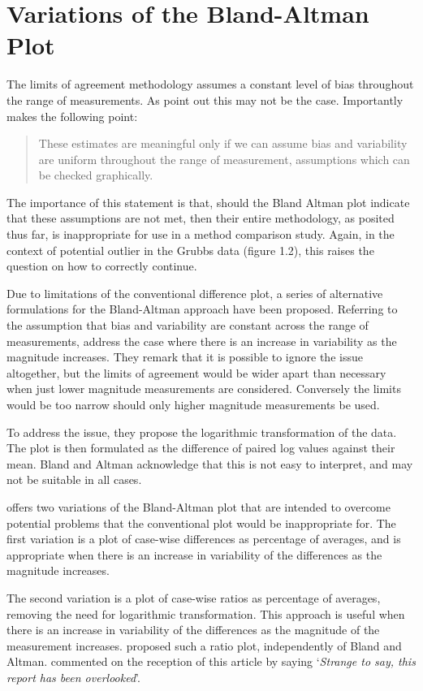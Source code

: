 \documentclass[12pt, a4paper]{report}
\theoremstyle{plain}
\theoremstyle{definition}
\theoremstyle{remark}
\begin{document}
\section{Variations of the Bland-Altman Plot} 
The limits of agreement methodology assumes a constant level of bias throughout the range of measurements. As \citet*{BA86} point out this may not be the case. 
Importantly \citet{BA99} makes the following point:
\begin{quote}These estimates are meaningful only if we can assume
	bias and variability are uniform throughout the range of
	measurement, assumptions which can be checked graphically.
\end{quote}

The importance of this statement is that, should the Bland Altman plot indicate that these assumptions are not met, then their
entire methodology, as posited thus far, is inappropriate for use
in a method comparison study. Again, in the context of potential
outlier in the Grubbs data (figure 1.2), this raises the question
on how to correctly continue. 

Due to limitations of the conventional difference plot, a series of alternative formulations for the Bland-Altman approach have been proposed. Referring to the assumption that bias and variability are constant across the range of measurements, \citet{BA99} address the case where there is an increase in variability as the magnitude increases. They remark that it is possible to ignore the issue altogether, but the limits of agreement would be wider apart than necessary when just lower magnitude measurements are considered. Conversely the limits would be too narrow should only higher magnitude measurements be used. 

To address the issue, they propose the logarithmic transformation of the data. The plot is then formulated as the difference of paired log values against their mean. Bland and Altman acknowledge that this is not easy to interpret, and may not be suitable in all cases.

\citet{BA99} offers two variations of the Bland-Altman plot that are intended to overcome potential problems that the conventional plot would be inappropriate for. The first variation is a plot of case-wise differences as percentage of averages, and is appropriate when there is an increase in variability of the differences as the magnitude increases. 

The second variation is a plot of case-wise ratios as percentage of averages, removing the need for logarithmic transformation. This approach is useful when there is an increase in variability of the differences as the magnitude of the measurement increases. \citet{Eksborg} proposed such a ratio plot, independently of Bland and Altman. \citet{Dewitte} commented on the reception of this article by saying `\textit{Strange to say, this report has been overlooked}'.
	
\end{document}

